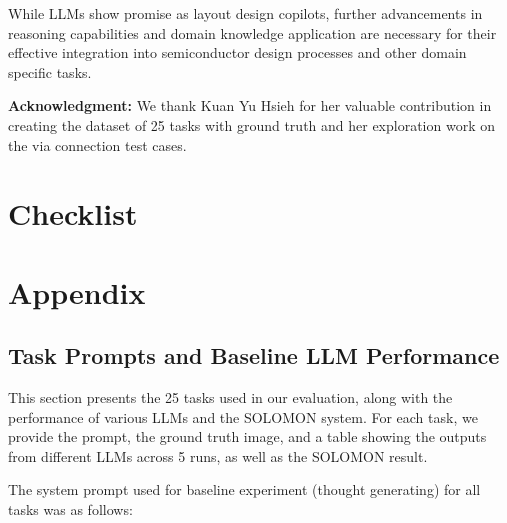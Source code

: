 \documentclass{article}
\begin{document}
While LLMs show promise as layout design copilots, further advancements in reasoning capabilities and domain knowledge application are necessary for their effective integration into semiconductor design processes and other domain specific tasks.

\textbf{Acknowledgment:} We thank Kuan Yu Hsieh for her valuable contribution in creating the dataset of 25 tasks with ground truth and her exploration work on the via connection test cases.




\newpage
\section*{Checklist}



\newpage
\appendix

\section{Appendix}
\subsection{Task Prompts and Baseline LLM Performance}
\label{appendix:task_prompts_and_performance}

This section presents the 25 tasks used in our evaluation, along with the performance of various LLMs and the SOLOMON system. For each task, we provide the prompt, the ground truth image, and a table showing the outputs from different LLMs across 5 runs, as well as the SOLOMON result.

The system prompt used for baseline experiment (thought generating) for all tasks was as follows:
\end{document}
